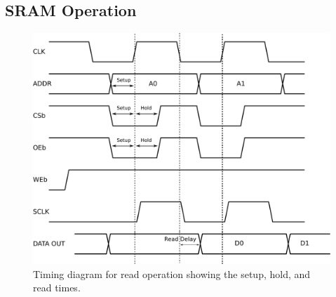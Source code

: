 \subsection{SRAM Operation}
\label{operation}

\begin{figure}[tb]
\centering
\includegraphics[scale=.85]{./figs/timing_read.pdf}
\caption{Timing diagram for read operation showing the setup, hold, and read times.}
\label{fig:read}
\end{figure}


